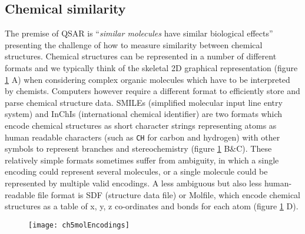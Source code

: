 \documentclass[a4paper,11pt,twoside,openright]{scrbook}
\begin{document}
\subsection{Chemical similarity}

The premise of QSAR is ``\textsl{similar molecules} have similar biological effects'' presenting the challenge of how 
to measure similarity between chemical structures.
Chemical structures can be represented in a number of different formats and we typically think of the skeletal 2D 
graphical representation (figure \ref{figure:mol_encodings} A) when considering complex organic molecules which have to 
be interpreted by chemists.
Computers however require a different format to efficiently store and parse chemical structure data.
SMILEs (simplified molecular input line entry system) and InChIs (international chemical identifier) are two formats 
which encode chemical structures as short character strings representing atoms as human readable characters (such as 
\texttt{CH} for carbon and hydrogen) with other symbols to represent branches and stereochemistry (figure 
\ref{figure:mol_encodings} B\&C).
These relatively simple formats sometimes suffer from ambiguity, in which a single encoding could represent several 
molecules, or a single molecule could be
represented by multiple valid encodings.
A less ambiguous but also less human-readable file format is SDF (structure data file) or Molfile, which encode 
chemical structures as a table of x, y, z co-ordinates and bonds for each atom (figure \ref{figure:mol_encodings} D).

\begin{figure}
     {
    \texttt{[image: ch5molEncodings]}
    \label{figure:mol_encodings}
}
\end{figure}
\end{document}
